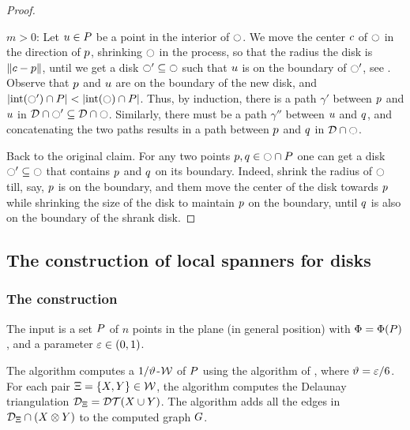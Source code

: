 \documentclass[12pt]{article}%
\begin{document}
\begin{proof}
\begin{compactitem}
\begin{figure}[h]
            \hfill%
            \phantom{}%
            \caption{}
        \end{figure}
        \item $m >0$: Let $u\in P$ be a point in the interior of
        $\ocircle$. We move the center $c$ of $\ocircle$ in the direction
        of $p$, shrinking $\ocircle$ in the process, so that the radius
        the disk is $\left\| c - p \right\|$, until we get a disk
        $\ocircle' \subseteq \ocircle$ such that $u$ is on the boundary of
        $\ocircle'$, see . Observe that $p$ and $u$
        are on the boundary of the new disk, and
        $|\interiorX{\disk'} \cap \PS| < |\interiorX{\disk} \cap
        \PS|$. Thus, by induction, there is a path $\gamma'$ between
        $p$ and $u$ in
        $\mathcal{D} \cap {\ocircle'} \subseteq
        \mathcal{D} \cap {\ocircle}$. Similarly, there must be a path
        $\gamma''$ between $u$ and $q$, and concatenating the two
        paths results in a path between $p$ and $q$ in
        $\mathcal{D} \cap {\ocircle}$.
    \end{compactitem}
    \medskip%
    \noindent
    Back to the original claim.  For any two points
    $p,q \in \ocircle \cap P$ one can get a disk
    $\ocircle' \subseteq \ocircle$ that contains $p$ and $q$ on its
    boundary.  Indeed, shrink the radius of $\ocircle$ till, say, $p$
    is on the boundary, and them move the center of the disk towards
    $p$ while shrinking the size of the disk to maintain $p$ on
    the boundary, until $q$ is also on the boundary of the shrank
    disk.
\end{proof}



\subsection{The construction of local spanners for disks}

\subsubsection{The construction}

The input is a set $P$ of $n$ points in the plane (in general
position) with $\spread = \spreadX{\PS}$, and a parameter
$\varepsilon \in (0,1)$.

The algorithm computes a $1/\vartheta$-\WSPD $\mathcal{W}$ of $P$ using the
algorithm of , where $\vartheta = \varepsilon/6$.  For
each pair $\Xi = \{X, Y \} \in \mathcal{W}$, the algorithm computes
the Delaunay triangulation $\DT_{\Pair} = \DTX{ \PSX \cup \PSY}$. The
algorithm adds all the edges in $\mathcal{D}_{\Xi} \cap (X \otimes Y)$
to the computed graph $G$.
\end{document}
